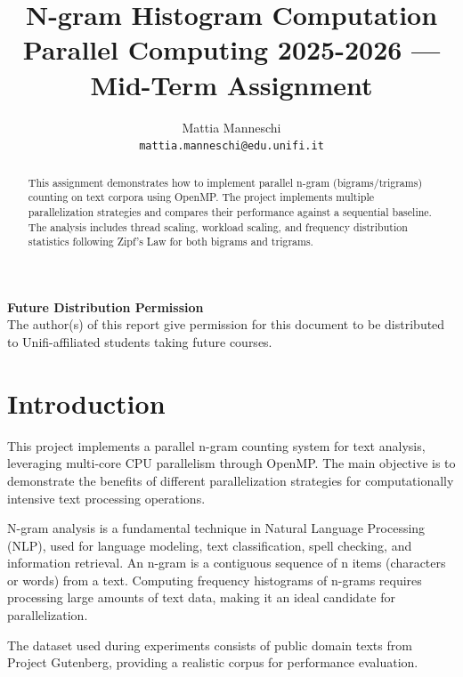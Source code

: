 \documentclass[10pt,twocolumn,letterpaper]{article}
\begin{document}
\title{N-gram Histogram Computation\\Parallel Computing 2025-2026 --- Mid-Term Assignment}

\author{Mattia Manneschi\\
{\tt\small mattia.manneschi@edu.unifi.it}
}

\maketitle
\thispagestyle{empty}

\begin{abstract}
This assignment demonstrates how to implement parallel n-gram (bigrams/trigrams) counting on text corpora using OpenMP. The project implements multiple parallelization strategies and compares their performance against a sequential baseline. The analysis includes thread scaling, workload scaling, and frequency distribution statistics following Zipf's Law for both bigrams and trigrams.
\end{abstract}

\noindent\large\textbf{Future Distribution Permission}\\
\indent The author(s) of this report give permission for this document to be distributed to Unifi-affiliated students taking future courses.

\section{Introduction}

This project implements a parallel n-gram counting system for text analysis, leveraging multi-core CPU parallelism through OpenMP. The main objective is to demonstrate the benefits of different parallelization strategies for computationally intensive text processing operations.

N-gram analysis is a fundamental technique in Natural Language Processing (NLP), used for language modeling, text classification, spell checking, and information retrieval. An n-gram is a contiguous sequence of n items (characters or words) from a text. Computing frequency histograms of n-grams requires processing large amounts of text data, making it an ideal candidate for parallelization.

The dataset used during experiments consists of public domain texts from Project Gutenberg, providing a realistic corpus for performance evaluation.
\end{document}
